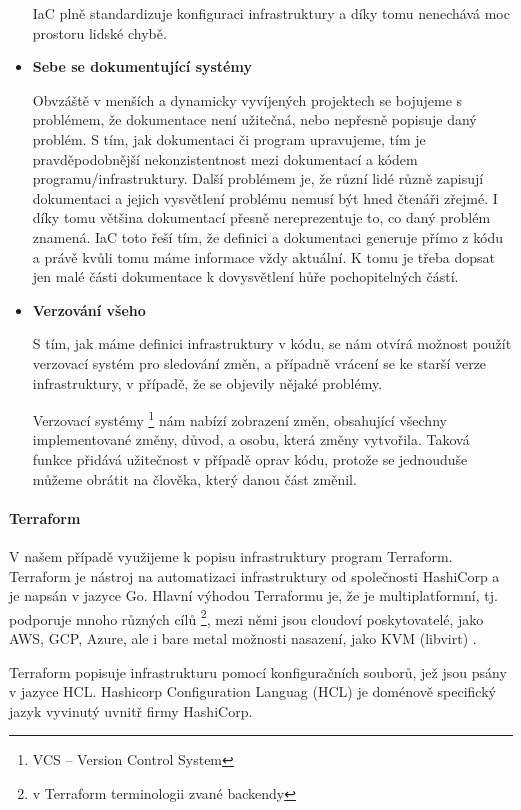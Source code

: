 \documentclass[thesis=M,czech]{FITthesis}[2019/12/23]
\theoremstyle{plain}
\theoremstyle{definition}
\begin{document}
\begin{itemize}
	IaC plně standardizuje konfiguraci infrastruktury a díky tomu nenechává moc prostoru lidské chybě.

	\item \textbf{Sebe se dokumentující systémy} 

	Obvzáště v menších a dynamicky vyvíjených projektech se bojujeme s problémem, že dokumentace není užitečná, nebo nepřesně popisuje daný problém. S tím, jak dokumentaci či program upravujeme, tím je pravděpodobnější nekonzistentnost mezi  dokumentací a kódem programu/infrastruktury. Další problémem je, že různí lidé různě zapisují dokumentaci a jejich vysvětlení problému nemusí být hned čtenáři zřejmé. I díky tomu většina dokumentací přesně nereprezentuje to, co daný problém znamená. IaC toto řeší tím, že definici a dokumentaci generuje přímo z kódu a právě kvůli tomu máme informace vždy aktuální. K tomu je třeba dopsat jen malé části dokumentace k dovysvětlení hůře pochopitelných částí.  

	\item \textbf{Verzování všeho} 

	S tím, jak máme definici infrastruktury v kódu, se nám otvírá možnost použít verzovací systém pro sledování změn, a případně vrácení se ke starší verze infrastruktury, v případě, že se objevily nějaké problémy.

	Verzovací systémy \footnote{VCS -- Version Control System} nám nabízí zobrazení změn, obsahující všechny implementované změny, důvod, a osobu, která změny vytvořila. Taková funkce přidává užitečnost v případě oprav kódu, protože se jednouduše můžeme obrátit na člověka, který danou část změnil. 
\end{itemize}

\paragraph{Terraform}

V našem případě využijeme k popisu infrastruktury program Terraform. Terraform je nástroj na automatizaci infrastruktury od společnosti HashiCorp a je napsán v jazyce Go. Hlavní výhodou Terraformu je, že je multiplatformní, tj. podporuje mnoho různých cílů \footnote{v Terraform terminologii zvané backendy}, mezi němi jsou  cloudoví poskytovatelé, jako AWS, GCP, Azure, ale i bare metal  možnosti nasazení, jako KVM (libvirt) \cite{tf-libvirt}.


Terraform popisuje infrastrukturu pomocí konfiguračních souborů, jež jsou psány v jazyce HCL. Hashicorp Configuration Languag (HCL) je doménově specifický jazyk vyvinutý uvnitř firmy HashiCorp.
\end{document}
